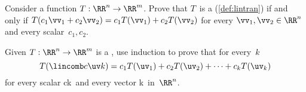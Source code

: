 \begin{exercise}  
Consider a function \(T:\RR^n\to\RR^m\).  
Prove that \(T\)~is a  (\cref{def:lintran}) if and only if \(T(c_1\vv_1+c_2\vv_2)=c_1T(\vv_1)+c_2T(\vv_2)\) for every \(\vv_1,\vv_2\in\RR^n\) and every scalar~\(c_1,c_2\).
\end{exercise}



\begin{exercise} \label{ex:genlintran} 
Given \(T:\RR^n\to\RR^m\) is a , use induction to prove that for every~\(k\)
\begin{equation*}
T(\lincomb c\uv k)
=c_1T(\uv_1)+c_2T(\uv_2)+\cdots+c_kT(\uv_k)
\end{equation*}
for every scalar \hlist ck\ and every vector \hlist \uv k\ in~\(\RR^n\).
\end{exercise}





